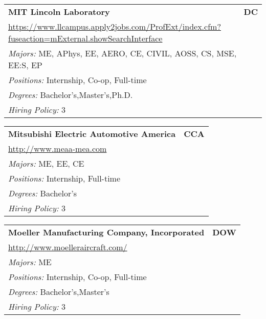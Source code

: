 \documentclass[twoside]{article}
\begin{document}
\begin{center}
\begin{multicols}{3}
\begin{FlushLeft}
\begin{minipage}{.9\columnwidth}\begin{tabularx}{.95\columnwidth}{Xr}
                 {\Large\bf MIT Lincoln Laboratory} & {\Large\bf DC}\\
    \multicolumn{2}{p{.95\columnwidth}}{\url{https://www.llcampus.apply2jobs.com/ProfExt/index.cfm?fuseaction=mExternal.showSearchInterface}}\\
    \multicolumn{2}{p{.95\columnwidth}}{\emph{Majors:} ME, APhys, EE, AERO, CE, CIVIL, AOSS, CS, MSE, EE:S, EP}\\
    \multicolumn{2}{p{.95\columnwidth}}{\emph{Positions:} Internship, Co-op, Full-time}\\
    \multicolumn{2}{p{.95\columnwidth}}{\emph{Degrees:} Bachelor's,Master's,Ph.D.}\\
    \multicolumn{2}{p{.95\columnwidth}}{\emph{Hiring Policy:} 3}\\
    \end{tabularx}
    
\end{minipage}
 
\begin{minipage}{.9\columnwidth}\begin{tabularx}{.95\columnwidth}{Xr}
                 {\Large\bf Mitsubishi Electric Automotive America} & {\Large\bf CCA}\\
    \multicolumn{2}{p{.95\columnwidth}}{\url{http://www.meaa-mea.com}}\\
    \multicolumn{2}{p{.95\columnwidth}}{\emph{Majors:} ME, EE, CE}\\
    \multicolumn{2}{p{.95\columnwidth}}{\emph{Positions:} Internship, Full-time}\\
    \multicolumn{2}{p{.95\columnwidth}}{\emph{Degrees:} Bachelor's}\\
    \multicolumn{2}{p{.95\columnwidth}}{\emph{Hiring Policy:} 3}\\
    \end{tabularx}
    
\end{minipage}
 
\begin{minipage}{.9\columnwidth}\begin{tabularx}{.95\columnwidth}{Xr}
                 {\Large\bf Moeller Manufacturing Company, Incorporated} & {\Large\bf DOW}\\
    \multicolumn{2}{p{.95\columnwidth}}{\url{http://www.moelleraircraft.com/}}\\
    \multicolumn{2}{p{.95\columnwidth}}{\emph{Majors:} ME}\\
    \multicolumn{2}{p{.95\columnwidth}}{\emph{Positions:} Internship, Co-op, Full-time}\\
    \multicolumn{2}{p{.95\columnwidth}}{\emph{Degrees:} Bachelor's,Master's}\\
    \multicolumn{2}{p{.95\columnwidth}}{\emph{Hiring Policy:} 3}\\
    \end{tabularx}
    

\end{minipage}
\end{FlushLeft}
\end{multicols}
\end{center}
\end{document}
